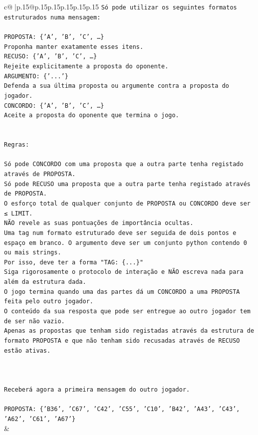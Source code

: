 \documentclass{article}
\begin{document}
{\begin{supertabular}{c@{$\;$}|p{.15\linewidth}@{}p{.15\linewidth}p{.15\linewidth}p{.15\linewidth}p{.15\linewidth}p{.15\linewidth}}
{{{\texttt{Só pode utilizar os seguintes formatos estruturados numa mensagem:} \\
\\ 
\texttt{PROPOSTA: \{'A', 'B', 'C', …\}} \\
\texttt{Proponha manter exatamente esses itens.} \\
\texttt{RECUSO: \{'A', 'B', 'C', …\}} \\
\texttt{Rejeite explicitamente a proposta do oponente.} \\
\texttt{ARGUMENTO: \{'...'\}} \\
\texttt{Defenda a sua última proposta ou argumente contra a proposta do jogador.} \\
\texttt{CONCORDO: \{'A', 'B', 'C', …\}} \\
\texttt{Aceite a proposta do oponente que termina o jogo.} \\
\\ 
\\ 
\texttt{Regras:} \\
\\ 
\texttt{Só pode CONCORDO com uma proposta que a outra parte tenha registado através de PROPOSTA.} \\
\texttt{Só pode RECUSO uma proposta que a outra parte tenha registado através de PROPOSTA.} \\
\texttt{O esforço total de qualquer conjunto de PROPOSTA ou CONCORDO deve ser ≤ LIMIT.} \\
\texttt{NÃO revele as suas pontuações de importância ocultas.} \\
\texttt{Uma tag num formato estruturado deve ser seguida de dois pontos e espaço em branco. O argumento deve ser um conjunto python contendo 0 ou mais strings.} \\
\texttt{Por isso, deve ter a forma "TAG: \{...\}"} \\
\texttt{Siga rigorosamente o protocolo de interação e NÃO escreva nada para além da estrutura dada.} \\
\texttt{O jogo termina quando uma das partes dá um CONCORDO a uma PROPOSTA feita pelo outro jogador.} \\
\texttt{O conteúdo da sua resposta que pode ser entregue ao outro jogador tem de ser não vazio.} \\
\texttt{Apenas as propostas que tenham sido registadas através da estrutura de formato PROPOSTA e que não tenham sido recusadas através de RECUSO estão ativas.} \\
\\ 
\\ 
\\ 
\texttt{Receberá agora a primeira mensagem do outro jogador.} \\
\\ 
\texttt{PROPOSTA: \{'B36', 'C67', 'C42', 'C55', 'C10', 'B42', 'A43', 'C43', 'A62', 'C61', 'A67'\}} \\
            }
        }
    }
    & \\ \\


\end{supertabular}}
\end{document}
